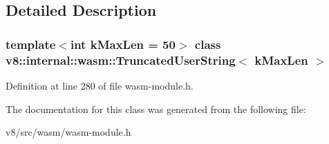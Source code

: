 \subsection{Detailed Description}
\subsubsection*{template$<$int k\+Max\+Len = 50$>$\newline
class v8\+::internal\+::wasm\+::\+Truncated\+User\+String$<$ k\+Max\+Len $>$}



Definition at line 280 of file wasm-\/module.\+h.



The documentation for this class was generated from the following file\+:\begin{DoxyCompactItemize}
\item 
v8/src/wasm/wasm-\/module.\+h\end{DoxyCompactItemize}

